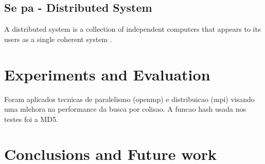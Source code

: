 \documentclass[12pt]{article}
\begin{document}
\subsection{Se pa - Distributed System}
A distributed system is a collection of independent computers that appears to its users as a single 
coherent system \cite{tanenbaum2002distributed}.
 
\section{Experiments and Evaluation}

Foram aplicados tecnicas de paralelismo (openmp) e distribuicao (mpi) visando uma mlehora na performance
da busca por colisao. A funcao hash usada nos testes foi a MD5.

\section{Conclusions and Future work}



\end{document}
